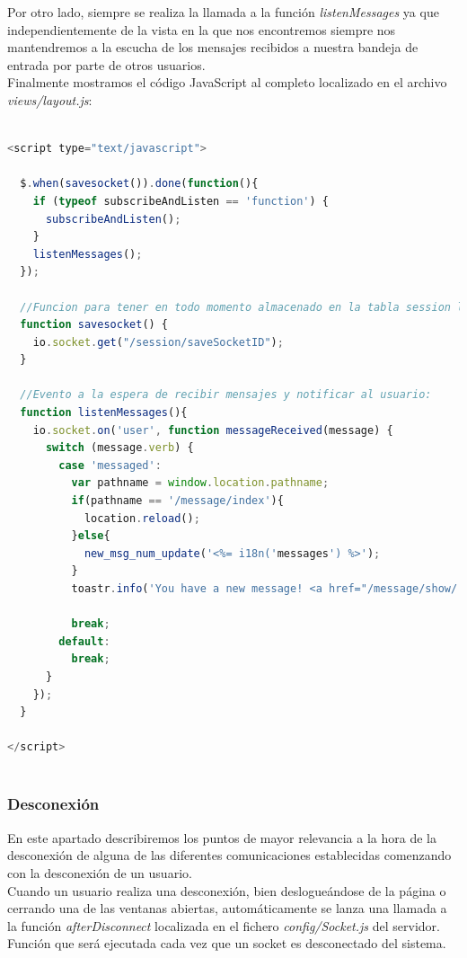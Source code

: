 Por otro lado, siempre se realiza la llamada a la función \emph{listenMessages} ya que independientemente de la vista en la que nos encontremos siempre nos mantendremos a la escucha de los mensajes 
recibidos a nuestra bandeja de entrada por parte de otros usuarios.\\

Finalmente mostramos el código JavaScript al completo localizado en el archivo \emph{views/layout.js}:\\


\begin{lstlisting}[language=JavaScript]

<script type="text/javascript">

  $.when(savesocket()).done(function(){
    if (typeof subscribeAndListen == 'function') {
      subscribeAndListen();
    }
    listenMessages();
  });

  //Funcion para tener en todo momento almacenado en la tabla session los sockets conectados junto con el usuario al que pertenece
  function savesocket() {
    io.socket.get("/session/saveSocketID");
  }

  //Evento a la espera de recibir mensajes y notificar al usuario:
  function listenMessages(){
    io.socket.on('user', function messageReceived(message) {
      switch (message.verb) {
        case 'messaged':
          var pathname = window.location.pathname;
          if(pathname == '/message/index'){
            location.reload();
          }else{
            new_msg_num_update('<%= i18n('messages') %>');
          }
          toastr.info('You have a new message! <a href="/message/show/' + message.data.msg.id + '"><%= i18n('open_here')%></a>' , 'Message');

          break;
        default:
          break;
      }
    });
  }

</script>
 
\end{lstlisting} 
 
\subsubsection { Desconexión }
\label{sec:deconexion}


En este apartado describiremos los puntos de mayor relevancia a la hora de la desconexión de alguna de las diferentes comunicaciones establecidas comenzando con la desconexión de un usuario.\\

Cuando un usuario realiza una desconexión, bien deslogueándose de la página o cerrando una de las ventanas abiertas, automáticamente se lanza una llamada a la 
función \emph{afterDisconnect} localizada en el fichero \emph{config/Socket.js} del servidor. Función que será ejecutada cada vez que un socket es desconectado del sistema.\\

